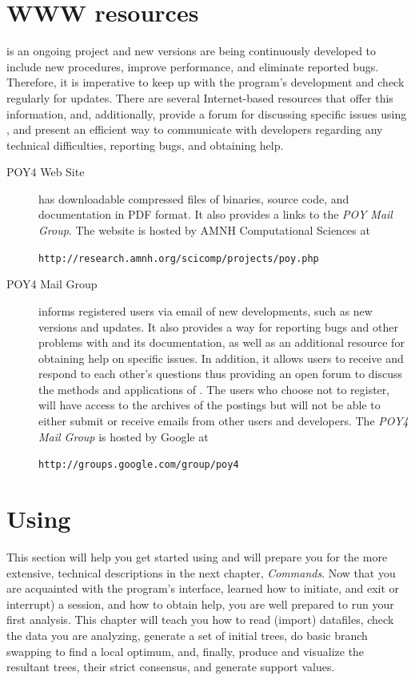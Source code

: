\section{WWW resources}
\poy is an ongoing project and new versions are being continuously developed to include new procedures, improve performance, and eliminate reported bugs. Therefore, it is imperative to keep up with the program's development and check regularly for updates. There are several Internet-based resources that offer this information, and, additionally, provide a forum for discussing specific issues using \poy, and present an efficient way to communicate with \poy developers regarding any technical difficulties, reporting bugs, and obtaining help.

\begin{description}
\item[POY4 Web Site] has downloadable compressed files of \poy binaries, source code, and documentation in PDF format. It also provides a links to the \emph{POY Mail Group}. The website is hosted by AMNH Computational Sciences at 
\begin{center}
\texttt{http://research.amnh.org/scicomp/projects/poy.php}
\end{center}
\item[POY4 Mail Group] informs registered users via email of new developments, such as new versions and updates. It also provides a way for reporting bugs and other problems with \poy and its documentation, as well as an additional resource for obtaining help on specific issues. In addition, it allows users to receive and respond to each other's questions thus providing an open forum to  discuss the methods and applications of \poy. The users who choose not to register, will have access to the archives of the postings but will not be able to either submit or receive emails from other users and \poy developers. The \emph{POY4 Mail Group} is hosted  by Google at
	\begin{center}
	\texttt{http://groups.google.com/group/poy4}
	\end{center}
	
\end{description}

\section{Using \poy}

This section will help you get started using \poy and will prepare you for the
more extensive, technical descriptions in the next chapter, \emph{\poy Commands}. Now that you are acquainted with the program's interface, learned how to initiate, and exit or interrupt) a \poy session, and how to obtain help, you are well prepared to run your first analysis. This chapter will teach
you how to read (import) datafiles, check the data you are analyzing, generate
a set of initial trees, do basic branch swapping to find a local optimum, and, finally, produce
and visualize the resultant trees, their strict consensus, and generate support values.

